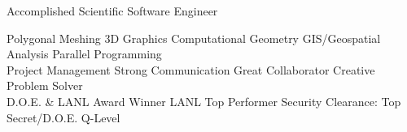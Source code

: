 \begin{headerbox}[boxrule=0.3mm]
{Accomplished Scientific Software Engineer}
\begin{center}
    Polygonal Meshing \idot 3D Graphics \idot Computational Geometry \idot GIS/Geospatial Analysis \idot Parallel Programming \\
    Project Management \idot Strong Communication \idot Great Collaborator \idot Creative Problem Solver \\
    D.O.E. \& LANL Award Winner \idot LANL Top Performer \idot Security Clearance: Top Secret/D.O.E. Q-Level\\
\end{center}
\end{headerbox}